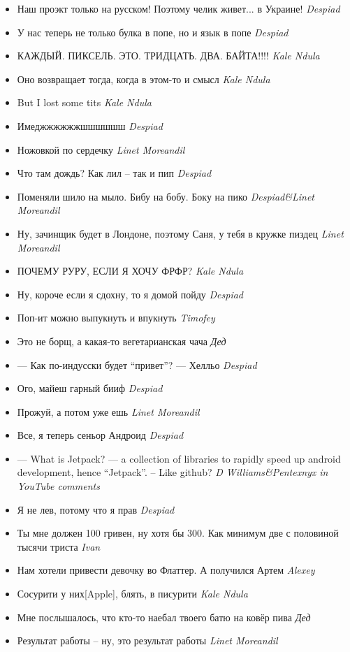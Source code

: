 \documentclass[11pt]{book}
\newcommand{\entry}[2] {\large{\textmd{#1}} \textemdash \small{\emph{#2}}}
\newcommand{\kn}{Kale Ndula}
\newcommand{\lm}{Linet Moreandil}
\newcommand{\dd}{Despiad}
\newcommand{\al}{Alexey}
\begin{document}
\begin{itemize}[leftmargin=0cm]
\item \entry{Наш проэкт только на русском! Поэтому челик живет... в Украине!}{\dd}
\item \entry{У нас теперь не только булка в попе, но и язык в попе}{\dd}
\item \entry{КАЖДЫЙ. ПИКСЕЛЬ. ЭТО. ТРИДЦАТЬ. ДВА. БАЙТА!!!!}{\kn}
\item \entry{Оно возвращает тогда, когда в этом-то и смысл}{\kn}
\item \entry{But I lost some tits}{\kn}
\item \entry{Имеджжжжжжшшшшшш}{\dd}
\item \entry{Ножовкой по сердечку}{\lm}
\item \entry{Что там дождь? Как лил -- так и пип}{\dd}
\item \entry{Поменяли шило на мыло. Бибу на бобу. Боку на пико}{\dd\&\lm}
\item \entry{Ну, зачинщик будет в Лондоне, поэтому Саня, у тебя в кружке пиздец}{\lm}
\item \entry{ПОЧЕМУ РУРУ, ЕСЛИ Я ХОЧУ ФРФР?}{\kn}
\item \entry{Ну, короче если я сдохну, то я домой пойду}{\dd}
\item \entry{Поп-ит можно выпукнуть и впукнуть}{Timofey}
\item \entry{Это не борщ, а какая-то вегетарианская чача}{Дед}
\item \entry{--- Как по-индусски будет ``привет''? --- Хелльо}{\dd}
\item \entry{Ого, майеш гарный бииф}{\dd}
\item \entry{Прожуй, а потом уже ешь}{\lm}
\item \entry{Все, я теперь сеньор Андроид}{\dd}
\item \entry{--- What is Jetpack? --- a collection of libraries to rapidly speed up android development, hence ``Jetpack''. -- Like github?}{D Williams\&Pentexnyx in YouTube comments}
\item \entry{Я не лев, потому что я прав}{\dd}
\item \entry{Ты мне должен 100 гривен, ну хотя бы 300. Как минимум две с половиной тысячи триста}{Ivan}
\item \entry{Нам хотели привести девочку во Флаттер. А получился Артем}{\al}
\item \entry{Сосурити у них[Apple], блять, в писурити}{\kn}
\item \entry{Мне послышалось, что кто-то наебал твоего батю на ковёр пива}{Дед}
\item \entry{Результат работы -- ну, это результат работы}{\lm}

\end{itemize}
\end{document}

